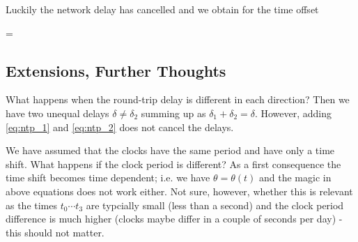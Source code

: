 Luckily the network delay has cancelled and we obtain for the time offset

\bee
\theta = 
\eee


\subsection{Extensions, Further Thoughts}

What happens when the round-trip delay is different in each direction? Then we have two unequal delays $\delta \neq \delta_2$ summing up as $\delta_1 + \delta_2 = \delta$. However, adding \eqref{eq:ntp_1} and \eqref{eq:ntp_2} does not cancel the delays. 

We have assumed that the clocks have the same period and have only a time shift. What happens if the clock period is different? As a first consequence the time shift becomes time dependent; i.e. we have $\theta = \theta(t)$ and the magic in above equations does not work either. Not sure, however, whether this is relevant as the times $t_0 \cdots t_3$ are typcially small (less than a second) and the clock period difference is much higher (clocks maybe differ in a couple of seconds per day) - this should not matter.


